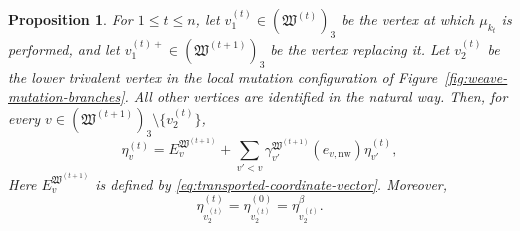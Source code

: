 \documentclass[12pt, reqno]{amsart}
\theoremstyle{plain}
\newtheorem{proposition}[theorem]{Proposition}
\theoremstyle{definition}
\numberwithin{equation}{section}
\begin{document}
\begin{proposition}\label{pro:eta-recursion}
For \(1\leq t\leq n\), let
\(v_1^{(t)}\in(\mathfrak W^{(t)})_3\) be the vertex at which
\(\mu_{k_t}\) is performed, and let
\(v_1^{(t)+}\in(\mathfrak W^{(t+1)})_3\) be the vertex replacing it.
Let \(v_2^{(t)}\) be the lower trivalent vertex in the local mutation
configuration of Figure~\ref{fig:weave-mutation-branches}. All other
vertices are identified in the natural way. Then, for every
\(v\in(\mathfrak W^{(t+1)})_3\setminus\{v_2^{(t)}\}\),
\begin{equation}\label{eq:etavt}
    \eta_v^{(t)}
    =E_{v}^{\mathfrak W^{(t+1)}}+
    \sum_{v'<v}
    \gamma_{v'}^{\mathfrak W^{(t+1)}}
        (e_{v,\mathrm{nw}})\eta_{v'}^{(t)},
\end{equation}
Here \(E_v^{\mathfrak W^{(t+1)}}\) is defined by
\eqref{eq:transported-coordinate-vector}.
Moreover,
\begin{equation}\label{eq:exceptional-lower-vector}
    \eta_{v_2^{(t)}}^{(t)}
    =\eta_{v_2^{(t)}}^{(0)}
    =\eta_{v_2^{(t)}}^\beta.
\end{equation}
\end{proposition}
\end{document}
